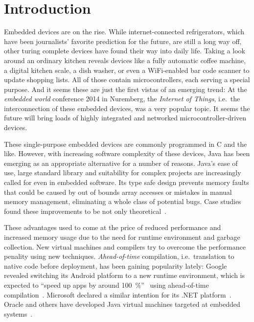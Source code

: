 
\chapter{Introduction}
	\label{chapter:intro}
	Embedded devices are on the rise. While internet-connected refrigerators, which have been journalists' favorite
	prediction for the future, are still a long way off, other turing complete devices have found their way into daily
	life. Taking a look around an ordinary kitchen reveals devices like a fully automatic coffee machine, a digital
	kitchen scale, a dish washer, or even a WiFi-enabled bar code scanner to update shopping lists. All of those contain
	microcontrollers, each serving a special purpose. And it seems these are just the first vistas of an emerging trend:
	At the \emph{embedded world} conference 2014 in Nuremberg, the \emph{Internet of Things}, i.e.\ the interconnection of
	these embedded devices, was a very popular topic. It seems the future will bring loads of highly integrated and
	networked microcontroller-driven devices.


	These single-purpose embedded devices are commonly programmed in C and the like. However, with increasing software
	complexity of these devices, Java has been emerging as an appropriate alternative for a number of reasons. Java's ease
	of use, large standard library and suitability for complex projects are increasingly called for even in embedded
	software. Its type safe design prevents memory faults that could be caused by out of bounds array accesses or mistakes
	in manual memory management, eliminating a whole class of potential bugs. Case studies found these improvements to be
	not only theoretical~\cite{phipps:99:spe}.

	These advantages used to come at the price of reduced performance and increased memory usage due to the need for
	runtime environment and garbage collection. New virtual machines and compilers try to overcome the performance
	penality using new techniques. \emph{Ahead-of-time} compilation, i.e.\ translation to native code before deployment,
	has been gaining popularity lately: Google revealed switching its Android platform to a new runtime environment, which
	is expected to \enquote{speed up apps by around 100~\%}~\cite{anthony:13:android-art} using ahead-of-time
	compilation~\cite{lindner:14:android-art}. Microsoft declared a similar intention for its .NET
	platform~\cite{lardinois:14:dotnet-aot}. Oracle and others have developed Java virtual machines targeted at embedded
	systems~\cite{merritt:13:java-for-IoT, maxfield:12:IS2T-JVM}.

